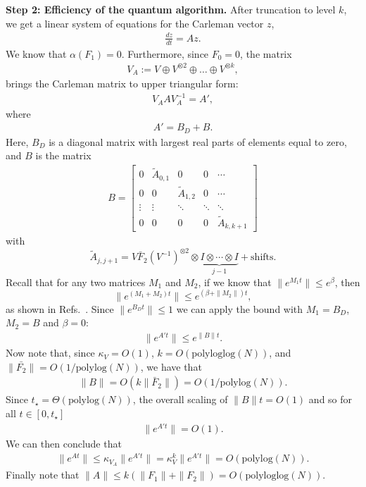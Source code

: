 \documentclass[superscriptaddress,onecolumn,nofootinbib,longbibliography,a4paper,accepted=2026-09-29]{quantumarticle}
\theoremstyle{plain}
\theoremstyle{definition}
\numberwithin{thm}{section}
\numberwithin{assumption}{section}
\numberwithin{lemma}{section}
\numberwithin{prop}{section}
\numberwithin{cor}{section}
\numberwithin{definition}{section}
\numberwithin{rmk}{section}
\numberwithin{equation}{section}
\begin{document}
\bigskip

\textbf{Step 2: Efficiency of the quantum algorithm.}  After truncation to level $k$, we get a linear system of equations for the Carleman vector $z$,
\begin{align}
    \frac{dz}{dt} = A z.
\end{align}
We know that $\alpha(F_1) = 0$. Furthermore, since $F_0 = 0$, the matrix
\begin{align}
   V_A:= V \oplus V^{\otimes 2} \oplus \dots \oplus V^{\otimes k},
\end{align}
brings the Carleman matrix to upper triangular form:
\begin{align}
    V_A A V_A^{-1} = A',
\end{align}
where
\begin{align}
    A' = B_D + B.
\end{align}
Here, $B_D$ is a diagonal matrix with largest real parts of elements equal to zero, and $B$ is the matrix
\begin{align}
    B = \begin{bmatrix}
        0 & \tilde{A}_{0,1} & 0 & 0 & \cdots \\
        0 & 0 & \tilde{A}_{1,2} & 0 & \cdots \\
        \vdots & \vdots & \ddots & \ddots & \ddots \\
        0 & 0 & 0 & 0 & \tilde{A}_{k, k+1}
    \end{bmatrix}\end{align}
with 
$$\tilde{A}_{j,j+1} = V \bar{F}_2 (V^{-1})^{\otimes 2} \otimes \underbrace{I \otimes \cdots \otimes I}_{j-1} + \mathrm{shifts}.$$
Recall that for any two matrices $M_1$ and $M_2$, if we know that $\|e^{M_1 t}\| \leq e^\beta$, then
\begin{equation}
    \|e^{(M_1 + M_2)t} \| \leq e^{(\beta + \| M_2\|)t},
\end{equation}
as shown in Refs.~\cite{kato2013perturbation,krovi2024quantum}.
Since $\|e^{B_D t}\| \leq 1$ we can apply the bound with $M_1 = B_D$, $M_2 = B$ and $\beta =0$:
\begin{align}
    \| e^{A' t} \| \leq e^{\|B\| t}. 
\end{align}
Now note that, since $\kappa_V = O(1)$, $k = O(\mathrm{polyloglog}(N))$, and $\|\bar{F_2}\| = O(1/\mathrm{polylog}(N))$, we have that 
\begin{align}
    \|B\| = O(k \| \bar{F}_2\|)  = O(1/ \mathrm{polylog}(N)).
\end{align}
Since $t_\star = \Theta(\mathrm{polylog}(N))$, the overall scaling of $\|B\| t = O(1)$ and so for all $t \in [0, t_\star]$
\begin{align}
    \|e^{A' t}\| = O(1).
\end{align}
We can then conclude that
\begin{align}
    \| e^{A t}\| \leq \kappa_{V_A} \|e^{A' t}\| = \kappa_V^{k} \|e^{A' t}\| = O(\mathrm{polylog}(N)).
\end{align}
Finally note that $\|A\| \leq k (\| F_1\| + \| F_2\|) = O(\mathrm{polyloglog}(N))$.
\end{document}
